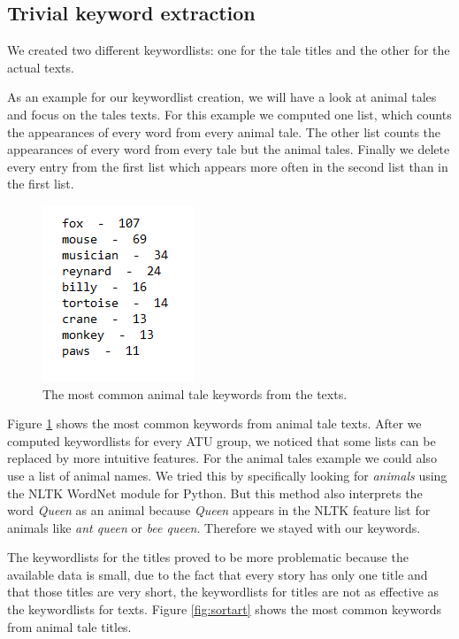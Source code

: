 \documentclass[a4paper]{article}
\begin{document}
\subsection{Trivial keyword extraction}

We created two different keywordlists: one for the tale titles and the other for the actual texts.

As an example for our keywordlist creation, we will have a look at animal tales and focus on the tales texts.
For this example we computed one list, which counts the appearances of every word from every animal tale.
The other list counts the appearances of every word from every tale but the animal tales.
Finally we delete every entry from the first list which appears more often in the second list than in the first list.

\begin{figure}
\centering
\includegraphics[]{random/sortedtextkeywords.PNG}
\caption{The most common animal tale keywords from the texts.}
\label{fig:sortkw}
\end{figure}

Figure \ref{fig:sortkw} shows the most common keywords from animal tale texts.
After we computed keywordlists for every ATU group, we noticed that some lists can be replaced by more intuitive features. For the animal tales example we could also use a list of animal names.
We tried this by specifically looking for \textit{animals} using the
NLTK WordNet module for Python. But this method also interprets the word \textit{Queen} as an animal because \textit{Queen} appears in the NLTK feature list for animals like \textit{ant queen} or \textit{bee queen}. Therefore we stayed with our keywords.

The keywordlists for the titles proved to be more problematic
because the available data is small, due to the fact that every story has
only one title and that those titles are very short, the keywordlists for
titles are not as effective as the keywordlists for texts. Figure
\ref{fig:sortart} shows the most common keywords from animal tale titles.
\end{document}
